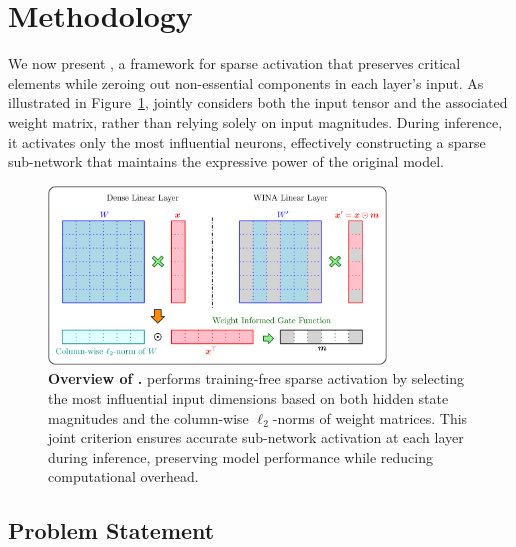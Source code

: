 \section{Methodology}
\label{sec:algo}

{
	We now present \algacro{}, a framework for sparse activation that preserves critical elements while zeroing out non-essential components in each layer's input. As illustrated in Figure~\ref{fig:Overview}, \algacro{} jointly considers both the input tensor and the associated weight matrix, rather than relying solely on input magnitudes. During inference, it activates only the most influential neurons, effectively constructing a sparse sub-network that maintains the expressive power of the original model.
}

\begin{figure}
	\centering
	\includegraphics[width=0.8\textwidth]{overview.png}
	\caption{{\textbf{Overview of \algacro{}.} \algacro{} performs training-free sparse activation by selecting the most influential input dimensions based on both hidden state magnitudes and the column-wise $\ell_2$-norms of weight matrices. This joint criterion ensures accurate sub-network activation at each layer during inference, preserving model performance while reducing computational overhead.}}
	\label{fig:Overview}
\end{figure}

\subsection{Problem Statement}

